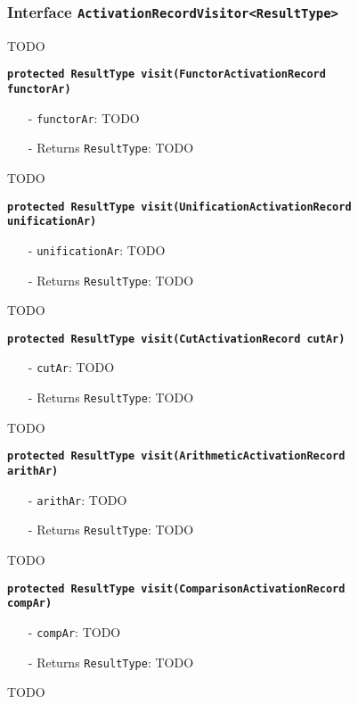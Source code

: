 \documentclass[parskip=full,11pt,twoside]{scrartcl}
\begin{document}
\subsubsection{Interface \texttt{ActivationRecordVisitor<ResultType>}}
TODO

\textbf{\texttt{protected ResultType visit(FunctorActivationRecord\\functorAr)}}
\begin{itemize}[noitemsep]
	\item[-] \texttt{functorAr}: TODO
	\item[-] Returns \texttt{ResultType}: TODO
\end{itemize}
TODO

\textbf{\texttt{protected ResultType visit(UnificationActivationRecord\\unificationAr)}}
\begin{itemize}[noitemsep]
	\item[-] \texttt{unificationAr}: TODO
	\item[-] Returns \texttt{ResultType}: TODO
\end{itemize}
TODO

\textbf{\texttt{protected ResultType visit(CutActivationRecord cutAr)}}
\begin{itemize}[noitemsep]
	\item[-] \texttt{cutAr}: TODO
	\item[-] Returns \texttt{ResultType}: TODO
\end{itemize}
TODO

\textbf{\texttt{protected ResultType visit(ArithmeticActivationRecord\\arithAr)}}
\begin{itemize}[noitemsep]
	\item[-] \texttt{arithAr}: TODO
	\item[-] Returns \texttt{ResultType}: TODO
\end{itemize}
TODO

\textbf{\texttt{protected ResultType visit(ComparisonActivationRecord\\compAr)}}
\begin{itemize}[noitemsep]
	\item[-] \texttt{compAr}: TODO
	\item[-] Returns \texttt{ResultType}: TODO
\end{itemize}
TODO

\end{document}
